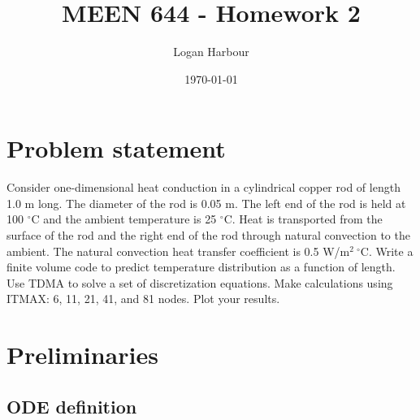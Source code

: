 \documentclass{article}
\newcommand{\pageTitle}{MEEN 644 - Homework 2}
\newcommand{\pageAuthor}{Logan Harbour}
\begin{document}
\title{\LARGE \textbf{\pageTitle} \vspace{-0.3cm}}
\author{\large \pageAuthor}
\date{\vspace{-0.6cm} \large \today \vspace{-0.4cm}}

\maketitle

\section*{Problem statement}

Consider one-dimensional heat conduction in a cylindrical copper rod of length 1.0 m long. The diameter of the rod is 0.05 m. The left end of the rod is held at 100 $^\circ$C and the ambient temperature is 25 $^\circ$C. Heat is transported from the surface of the rod and the right end of the rod through natural convection to the ambient. The natural convection heat transfer coefficient is 0.5 W/m$^2~^\circ$C. Write a finite volume code to predict temperature distribution as a function of length. Use TDMA to solve a set of discretization equations. Make calculations using ITMAX: 6, 11, 21, 41, and 81 nodes. Plot your results.

\section*{Preliminaries}

\subsection*{ODE definition}
\end{document}
